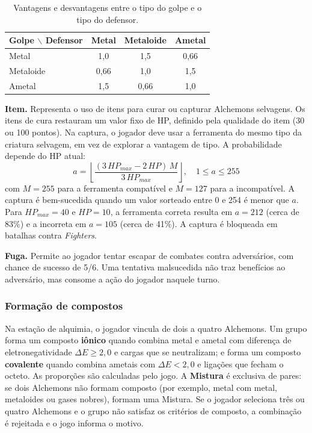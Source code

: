 \begin{table}[!h]
\caption{Vantagens e desvantagens entre o tipo do golpe e o tipo do defensor.}
\label{tab:tipos}
\centering
\footnotesize
\begin{tabular}{@{}lccc@{}}
\hline
\textbf{Golpe $\backslash$ Defensor} & \textbf{Metal} & \textbf{Metaloide} & \textbf{Ametal} \\
\hline
Metal & 1,0 & 1,5 & 0,66 \\
Metaloide & 0,66 & 1,0 & 1,5 \\
Ametal & 1,5 & 0,66 & 1,0 \\
\hline
\end{tabular}
\end{table}

\textbf{Item.} Representa o uso de itens para curar ou capturar Alchemons selvagens. Os itens de cura restauram um valor fixo de HP, definido pela qualidade do item (30 ou 100 pontos). Na captura, o jogador deve usar a ferramenta do mesmo tipo da criatura selvagem, em vez de explorar a vantagem de tipo. A probabilidade depende do HP atual:
\begin{equation}
a=\left\lfloor \frac{(3\,HP_{max}-2\,HP)\,M}{3\,HP_{max}} \right\rfloor,\quad 1\le a\le 255
\label{eq:captura}
\end{equation}
com $M=255$ para a ferramenta compatível e $M=127$ para a incompatível. A captura é bem-sucedida quando um valor sorteado entre 0 e 254 é menor que $a$. Para $HP_{max}=40$ e $HP=10$, a ferramenta correta resulta em $a=212$ (cerca de 83\%) e a incorreta em $a=105$ (cerca de 41\%). A captura é bloqueada em batalhas contra \textit{Fighters}.

\textbf{Fuga.} Permite ao jogador tentar escapar de combates contra adversários, com chance de sucesso de 5/6. Uma tentativa malsucedida não traz benefícios ao adversário, mas consome a ação do jogador naquele turno.

\subsubsection{Formação de compostos}
Na estação de alquimia, o jogador vincula de dois a quatro Alchemons. Um grupo forma um composto \textbf{iônico} quando combina metal e ametal com diferença de eletronegatividade $\Delta E\ge 2{,}0$ e cargas que se neutralizam; e forma um composto \textbf{covalente} quando combina ametais com $\Delta E<2{,}0$ e ligações que fecham o octeto. As proporções são calculadas pelo jogo. A \textbf{Mistura} é exclusiva de pares: se dois Alchemons não formam composto (por exemplo, metal com metal, metaloides ou gases nobres), formam uma Mistura. Se o jogador seleciona três ou quatro Alchemons e o grupo não satisfaz os critérios de composto, a combinação é rejeitada e o jogo informa o motivo.

